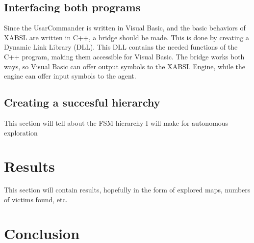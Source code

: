 \documentclass[a4paper,10pt]{article}
\begin{document}
\subsection{Interfacing both programs}
Since the UsarCommander is written in Visual Basic, and the basic behaviors of
XABSL are written in C++, a bridge should be made. This is done by creating a
Dynamic Link Library (DLL). This DLL contains the needed functions of the C++
program, making them accessible for Visual Basic. The bridge works both ways, so
Visual Basic can offer output symbols to the XABSL Engine, while the engine can
offer input symbols to the agent.

\subsection{Creating a succesful hierarchy}
This section will tell about the FSM hierarchy I will make for autonomous
exploration


\section{Results}
This section will contain results, hopefully in the form of explored maps, numbers of victims found, etc.

\section{Conclusion}

{}

\end{document}
